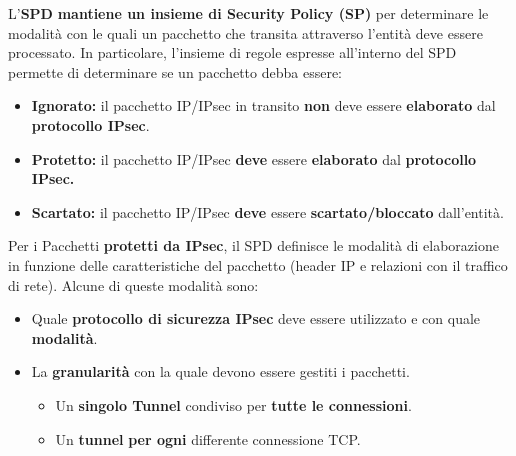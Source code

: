 \begin{definition}\label{def:spd}
L'\textbf{SPD} \textbf{mantiene un insieme di Security Policy (SP)} per determinare le modalità con le quali un pacchetto che transita attraverso l’entità deve essere processato. In particolare, l’insieme di regole espresse all’interno del SPD permette di determinare se un pacchetto debba essere:
\begin{itemize}
    \item \textbf{Ignorato:} il pacchetto IP/IPsec in transito \textbf{non} deve essere \textbf{elaborato} dal \textbf{protocollo IPsec}.
    \item \textbf{Protetto:} il pacchetto IP/IPsec \textbf{deve} essere \textbf{elaborato} dal \textbf{protocollo IPsec.}
    \item \textbf{Scartato:} il pacchetto IP/IPsec \textbf{deve} essere \textbf{scartato/bloccato} dall’entità.
\end{itemize}
Per i Pacchetti \textbf{protetti da IPsec}, il SPD definisce le modalità di elaborazione in funzione delle caratteristiche del pacchetto (header IP e relazioni con il traffico di rete). Alcune di queste modalità sono:
\begin{itemize}
    \item Quale \textbf{protocollo di sicurezza IPsec} deve essere utilizzato e con quale \textbf{modalità}.
    \item La \textbf{granularità} con la quale devono essere gestiti i pacchetti.
    \begin{itemize}
        \item Un \textbf{singolo Tunnel} condiviso per \textbf{tutte le connessioni}.
        \item Un \textbf{tunnel} \textbf{per ogni} differente connessione TCP.
    \end{itemize}
\end{itemize}
\end{definition}
